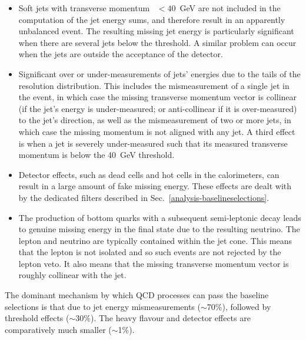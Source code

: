 \begin{itemize}
	\item Soft jets with transverse momentum \pt~$<40$~GeV are not included in 
	the computation of the jet energy sums, and therefore result in an 
	apparently unbalanced event.
	The resulting missing jet energy is particularly significant when there are 
	several jets below the \pt threshold. A similar problem can occur when the 
	jets are outside the acceptance of the detector.
	\item Significant over or under-measurements of jets' energies due to the 
	tails of the resolution distribution. This includes the mismeasurement of a 
	single jet in the event, in which case the missing transverse momentum 
	vector is collinear (if the jet's energy is under-measured; or 
	anti-collinear
	if it is over-measured) to the jet's direction, as well as the 
	mismeasurement of two or more jets, in which case the missing momentum is 
	not aligned with any jet. A third effect is when a jet is severely 
	under-measured such that its measured transverse momentum is below the 
	40~GeV threshold. 
	\item Detector effects, such as dead cells and hot cells in the 
	calorimeters, can result in a large amount of fake missing energy. These 
	effects are dealt with by the dedicated \met filters described in 
	Sec.~\ref{analysis-baselineselections}.
	\item The production of bottom quarks with a subsequent semi-leptonic decay 
	leads to genuine missing energy in the final state due to the resulting 
	neutrino. The lepton and neutrino are typically contained within the jet 
	cone. This means that the lepton is not isolated and so such events are not 
	rejected by the lepton veto. It also means that the missing transverse 
	momentum vector is roughly collinear with the jet. %
\end{itemize}

The dominant mechanism by which QCD processes can pass the baseline selections 
is that due to jet energy mismeasurements ($\sim$70\%), followed by threshold 
effects ($\sim$30\%). The heavy flavour and detector effects are comparatively 
much smaller ($\sim$1\%).


